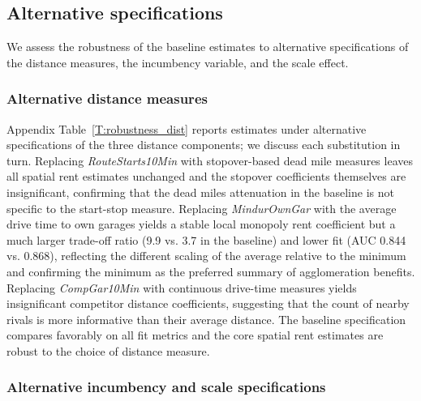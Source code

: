 \documentclass[12pt]{article}
\begin{document}
\subsection{Alternative specifications}\label{S:Robustness}
We assess the robustness of the baseline estimates to alternative 
specifications of the distance measures, the incumbency variable, and 
the scale effect.

\subsubsection{Alternative distance measures}\label{SS:robust-dist}

Appendix Table~\ref{T:robustness_dist} reports estimates under alternative 
specifications of the three distance components; we discuss each substitution 
in turn. Replacing \textit{RouteStarts10Min} with stopover-based dead mile 
measures leaves all spatial rent estimates unchanged and the stopover 
coefficients themselves are insignificant, confirming that the dead miles 
attenuation in the baseline is not specific to the start-stop measure. 
Replacing \textit{MindurOwnGar} with the average drive time to own garages 
yields a stable local monopoly rent coefficient but a much larger trade-off 
ratio (9.9 vs. 3.7 in the baseline) and lower fit (AUC 0.844 vs. 0.868), 
reflecting the different scaling of the average relative to the minimum and 
confirming the minimum as the preferred summary of agglomeration benefits. 
Replacing \textit{CompGar10Min} with continuous drive-time measures yields 
insignificant competitor distance coefficients, suggesting that the count 
of nearby rivals is more informative than their average distance. The 
baseline specification compares favorably on all fit metrics and the core 
spatial rent estimates are robust to the choice of distance measure.

\subsubsection{Alternative incumbency and scale 
specifications}\label{SS:robust-inc}
\end{document}
